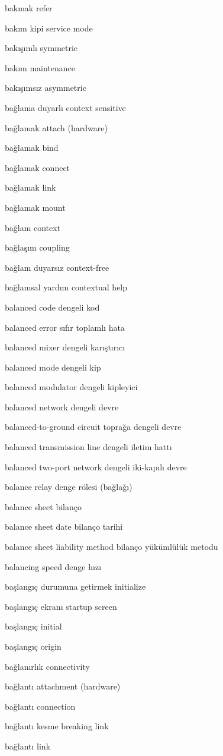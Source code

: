\documentclass[12pt,fleqn]{article}\usepackage{../../common}
\begin{document}
bakmak refer

bakım kipi service mode

bakışımlı symmetric

bakım maintenance

bakışımsız asymmetric

bağlama duyarlı context sensitive

bağlamak attach (hardware)

bağlamak bind

bağlamak connect

bağlamak link

bağlamak mount

bağlam context

bağlaşım coupling

bağlam duyarsız context-free

bağlamsal yardım contextual help

balanced code dengeli kod

balanced error sıfır toplamlı hata

balanced mixer dengeli karıştırıcı

balanced mode dengeli kip

balanced modulator dengeli kipleyici

balanced network dengeli devre

balanced-to-ground circuit toprağa dengeli devre

balanced transmission line dengeli iletim hattı

balanced two-port network dengeli iki-kapılı devre

balance relay denge rölesi (bağlağı)

balance sheet bilanço

balance sheet date bilanço tarihi

balance sheet liability method bilanço yükümlülük metodu

balancing speed denge hızı

başlangıç durumuna getirmek initialize

başlangıç ekranı startup screen

başlangıç initial

başlangıç origin

bağlanırlık connectivity

bağlantı attachment (hardware)

bağlantı connection

bağlantı kesme breaking link

bağlantı link
\end{document}
